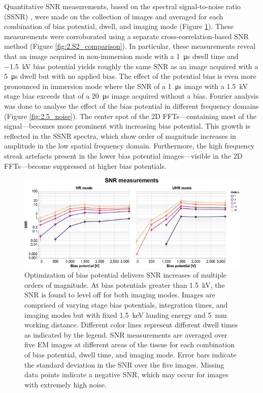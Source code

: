 Quantitative SNR measurements, based on the spectral signal-to-noise ratio (SSNR) \cite{unser1987new}, were made on the collection of images and averaged for each combination of bias potential, dwell, and imaging mode (Figure \ref{fig:2.4_snr}). These measurements were corroborated using a separate cross-correlation-based SNR method \cite{joy2002smart} (Figure \ref{fig:2.S2_comparison}). In particular, these measurements reveal that an image acquired in non-immersion mode with a \SI{1}{\micro\second} dwell time and \SI{-1.5}{\kilo\volt} bias potential yields roughly the same SNR as an image acquired with a \SI{5}{\micro\second} dwell but with no applied bias. The effect of the potential bias is even more pronounced in immersion mode where the SNR of a \SI{1}{\micro\second} image with a \SI{1.5}{\kilo\volt} stage bias exceeds that of a \SI{20}{\micro\second} image acquired without a bias. Fourier analysis was done to analyse the effect of the bias potential in different frequency domains (Figure \ref{fig:2.5_noise}). The center spot of the 2D FFTs—containing most of the signal—becomes more prominent with increasing bias potential. This growth is reflected in the SSNR spectra, which show order of magnitude increases in amplitude in the low spatial frequency domain. Furthermore, the high frequency streak artefacts present in the lower bias potential images---visible in the 2D FFTs---become suppressed at higher bias potentials.

\begin{figure}[!tbh]
    \centering
    \includegraphics[width=\linewidth]{chapter-2/figures_JPEG_LQ/fig2-4_snr.jpg}
    \caption{Optimization of bias potential delivers SNR increases of multiple orders of magnitude. At bias potentials greater than \SI{1.5}{\kilo\volt}, the SNR is found to level off for both imaging modes. Images are comprised of varying stage bias potentials, integration times, and imaging modes but with fixed \SI{1.5}{\kilo\electronvolt} landing energy and \SI{5}{\milli\meter} working distance. Different color lines represent different dwell times as indicated by the legend. SNR measurements are averaged over five EM images at different areas of the tissue for each combination of bias potential, dwell time, and imaging mode. Error bars indicate the standard deviation in the SNR over the five images. Missing data points indicate a negative SNR, which may occur for images with extremely high noise.}
    \label{fig:2.4_snr}
\end{figure}


